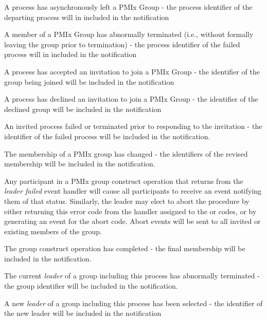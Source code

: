 \begin{constantdesc}
%
A process has asynchronously left a \ac{PMIx} Group - the process identifier of the departing process will in included in the notification

%
A member of a \ac{PMIx} Group has abnormally terminated (i.e., without formally leaving the group prior to termination) - the process identifier of the failed process will in included in the notification

%
A process has accepted an invitation to join a \ac{PMIx} Group - the identifier of the group being joined will be included in the notification

%
A process has declined an invitation to join a \ac{PMIx} Group - the identifier of the declined group will be included in the notification

%
An invited process failed or terminated prior to responding to the invitation - the identifier of the failed process will be included in the notification.

%
The membership of a \ac{PMIx} group has changed - the identifiers of the revised membership will be included in the notification.

%
Any participant in a \ac{PMIx} group construct operation that returns  from the \emph{leader failed} event handler will cause all participants to receive an event notifying them of that status. Similarly, the leader may elect to abort the procedure by either returning this error code from the handler assigned to the  or  codes, or by generating an event for the abort code. Abort events will be sent to all invited or existing members of the group.

%
The group construct operation has completed - the final membership will be included in the notification.

%
The current \emph{leader} of a group including this process has abnormally terminated - the group identifier will be included in the notification.

%
A new \emph{leader} of a group including this process has been selected - the identifier of the new leader will be included in the notification


\end{constantdesc}
